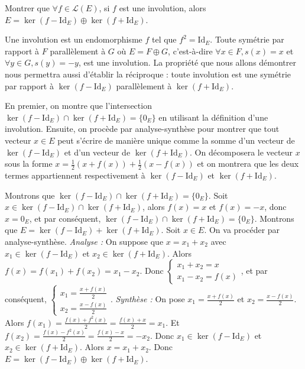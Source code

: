 \documentclass[11pt, a4paper]{article}
\theoremstyle{definition}
\begin{document}
\clearpage

\begin{tcolorbox}[instructionstyle]
	Montrer que $\forall f \in \mathcal L(E)$, si $f$ est une involution, alors $E = \ker(f - \mathrm{Id}_E) \oplus \ker(f + \mathrm{Id}_E)$.
\end{tcolorbox}

\begin{rappel}
	Une involution est un endomorphisme $f$ tel que $f^2 = \mathrm{Id}_E$. Toute symétrie par rapport à $F$ parallèlement à $G$ où $E = F \oplus G$, c'est-à-dire $\forall x \in F, s(x) = x$ et $\forall y \in G, s(y) = -y$, est une involution. La propriété que nous allons démontrer nous permettra aussi d'établir la réciproque : toute involution est une symétrie par rapport à $\ker(f - \mathrm{Id}_E)$ parallèlement à $\ker(f + \mathrm{Id}_E)$.
\end{rappel}

\begin{tcolorbox}[methodstyle]
	En premier, on montre que l'intersection $\ker(f - \mathrm{Id}_E) \cap \ker(f + \mathrm{Id}_E) = \{0_E\}$ en utilisant la définition d'une involution. Ensuite, on procède par analyse-synthèse pour montrer que tout vecteur $x \in E$ peut s'écrire de manière unique comme la somme d'un vecteur de $\ker(f - \mathrm{Id}_E)$ et d'un vecteur de $\ker(f + \mathrm{Id}_E)$. On décomposera le vecteur $x$ sous la forme $x = \frac{1}{2}(x + f(x)) + \frac{1}{2}(x - f(x))$ et on montrera que les deux termes appartiennent respectivement à $\ker(f - \mathrm{Id}_E)$ et $\ker(f + \mathrm{Id}_E)$.
\end{tcolorbox}

\begin{outline}
	\1 Montrons que $\ker(f - \mathrm{Id}_E) \cap \ker(f + \mathrm{Id}_E) = \{0_E\}$.
	\2 Soit $x \in \ker(f - \mathrm{Id}_E) \cap \ker(f + \mathrm{Id}_E)$, alors $f(x) = x$ et $f(x) = -x$, donc $x = 0_E$, et par conséquent, $\ker(f - \mathrm{Id}_E) \cap \ker(f + \mathrm{Id}_E) = \{0_E\}$.
	\1 Montrons que $E = \ker(f - \mathrm{Id}_E) + \ker(f + \mathrm{Id}_E)$.
	\2 Soit $x \in E$. On va procéder par analyse-synthèse.
	\2 \textit{Analyse :}
	\3 On suppose que $x = x_1 + x_2$ avec $x_1 \in \ker(f - \mathrm{Id}_E)$ et $x_2 \in \ker(f + \mathrm{Id}_E)$.
	\3 Alors $f(x) = f(x_1) + f(x_2) = x_1 - x_2$.
	\3 Donc $\begin{cases}x_1 + x_2 = x\\ x_1 - x_2 = f(x)\end{cases}$, et par conséquent, $\begin{cases}x_1 = \frac{x + f(x)}{2}\\ x_2 = \frac{x - f(x)}{2}\end{cases}$.
	\2 \textit{Synthèse :}
	\3 On pose $x_1 = \frac{x + f(x)}{2}$ et $x_2 = \frac{x - f(x)}{2}$.
	\3 Alors $f(x_1) = \frac{f(x) + f^2(x)}{2} = \frac{f(x) + x}{2} = x_1$.
	\3 Et $f(x_2) = \frac{f(x) - f^2(x)}{2} = \frac{f(x) - x}{2} = -x_2$.
	\3 Donc $x_1 \in \ker(f - \mathrm{Id}_E)$ et $x_2 \in \ker(f + \mathrm{Id}_E)$.
	\3 Alors $x = x_1 + x_2$.
	\1 Donc $E = \ker(f - \mathrm{Id}_E) \oplus \ker(f + \mathrm{Id}_E)$.
\end{outline}
\end{document}
